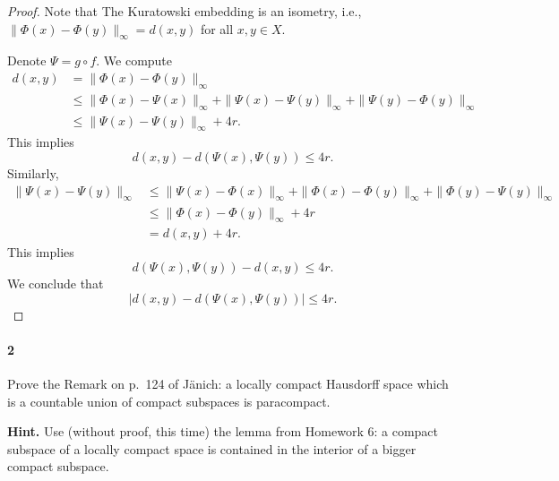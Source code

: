 \documentclass[12pt]{article}
\newlength{\myparskip}
\newenvironment{fullbox}{\begin{lrbox}{\savefullbox}\begin{minipage}{\dimexpr\textwidth-2\fboxsep\relax}\setlength{\parskip}{\myparskip}}{\end{minipage}\end{lrbox}\framebox[\textwidth]{\usebox{\savefullbox}}}
\newenvironment{pbox}[1][]{\begin{fullbox}\ifx#1\empty\else\paragraph{#1}\phantom{}\fi}{\end{fullbox}}
\theoremstyle{definition}
\newcommand{\<}{\langle}
\renewcommand{\>}{\rangle}
\begin{document}
\begin{proof}
    Note that The Kuratowski embedding is an isometry, i.e., $\|\Phi(x) - \Phi(y)\|_\infty = d(x, y)$ for all $x, y \in X$.

    Denote $\Psi = g \circ f$. 
    We compute
    \begin{align*}
        d(x, y)
            &= \|\Phi(x) - \Phi(y)\|_\infty \\
            &\leq \|\Phi(x) - \Psi(x)\|_\infty 
             + \|\Psi(x) - \Psi(y)\|_\infty 
             + \|\Psi(y) - \Phi(y)\|_\infty \\
            &\leq \|\Psi(x) - \Psi(y)\|_\infty + 4r.
    \end{align*}
    This implies
    \[
        d(x,y)-d(\Psi(x), \Psi(y)) \leq 4r.
    \]
    Similarly,
    \begin{align*}
        \|\Psi(x) - \Psi(y)\|_\infty
            &\leq \|\Psi(x) - \Phi(x)\|_\infty 
            + \|\Phi(x) - \Phi(y)\|_\infty 
            + \|\Phi(y) - \Psi(y)\|_\infty \\
            &\leq \|\Phi(x) - \Phi(y)\|_\infty + 4r \\
            &= d(x, y) + 4r.
    \end{align*}
    This implies
    \[
        d(\Psi(x), \Psi(y)) - d(x, y) \leq 4r.
    \]
    We conclude that
    \[
        \big|d(x, y) - d(\Psi(x), \Psi(y))\big| \leq 4r.
    \]
\end{proof}


\newpage
\begin{pbox}[2]
    Prove the Remark on p.~124 of J\"anich: a locally compact Hausdorff space
  which is a countable union of compact subspaces is paracompact.

  \textbf{Hint.} Use (without proof, this time) the lemma from Homework 6: a
  compact subspace of a locally compact space is contained in the interior of a
  bigger compact subspace.
\end{pbox}
\end{document}
